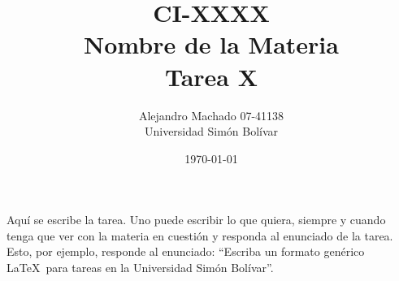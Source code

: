 \documentclass[letterpaper,11pt]{article}
\begin{document}
\title{CI-XXXX \\ Nombre de la Materia\\ Tarea X \\}
\author{Alejandro Machado 07-41138 \\ Universidad Simón Bolívar}
\date{\today}
\maketitle

\thispagestyle{empty}
\pagestyle{empty}

Aquí se escribe la tarea. Uno puede escribir lo que quiera, siempre y cuando
tenga que ver con la materia en cuestión y responda al enunciado de la tarea.
Esto, por ejemplo, responde al enunciado: ``Escriba un formato genérico \LaTeX\
para tareas en la Universidad Simón Bolívar''.
\end{document}

